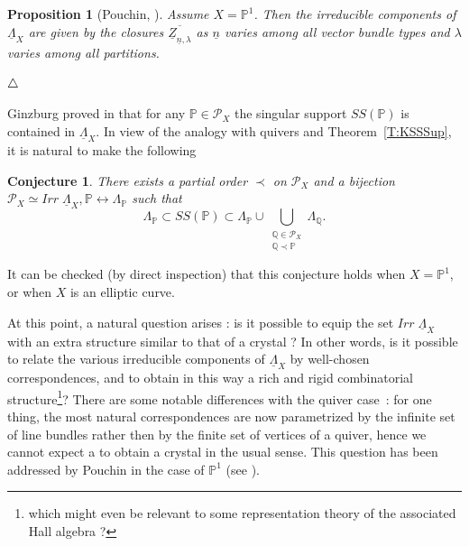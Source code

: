 \documentclass[a4paper,10pt]{amsart}
\def\endexample{$\hfill \triangle$}
\def\endexample{$\hfill \triangle$}
\newtheorem{prop}[theo]{Proposition}
\newtheorem{conj}[theo]{Conjecture}
\numberwithin{equation}{section}
\begin{document}
\begin{prop}[Pouchin, \cite{Pouchin}] Assume $X=\mathbb{P}^1$. Then the irreducible components of $\underline{\Lambda}_X$ are given by
the closures $\overline{\underline{Z}_{\underline{n},\lambda}}$ 
as $\underline{n}$ varies among all vector bundle types and $\lambda$ varies among all partitions.
\end{prop}
\endexample

\vspace{.2in}

Ginzburg proved in \cite{Ginzburg} that for any $\mathbb{P} \in \mathcal{P}_X$ the singular support
$SS(\mathbb{P})$ is contained in $\underline{\Lambda}_X$. In view of the analogy with quivers and Theorem~\ref{T:KSSSup}, it is natural to make the following

\begin{conj} There exists a partial order $\prec$ on $\mathcal{P}_X$ and a bijection $\mathcal{P}_X \simeq Irr\;\underline{\Lambda}_X, \mathbb{P} \leftrightarrow \Lambda_{\mathbb{P}}$ such that
$$\Lambda_{\mathbb{P}} \subset SS(\mathbb{P}) \subset \Lambda_{\mathbb{P}} \cup \bigcup_{\substack{\mathbb{Q} \in \mathcal{P}_X\\ \mathbb{Q} \prec \mathbb{P}}} \Lambda_{\mathbb{Q}}.$$
\end{conj}

It can be checked (by direct inspection) that this conjecture holds when $X=\mathbb{P}^1$, or when $X$ is an elliptic curve.

\vspace{.1in}

At this point, a natural question arises : is it possible to equip the set $Irr\;\underline{\Lambda}_X$ with an extra structure similar to that of a crystal ? In other words, is it possible to relate the various irreducible components of $\underline{\Lambda}_X$ by well-chosen correspondences, and to obtain in this way a rich and rigid combinatorial structure\footnote{which might even be relevant to some representation theory of the associated Hall algebra ?}? There are some notable differences with the quiver case~: for one thing, the most natural correspondences are now parametrized by the infinite set of line bundles rather then by the finite set of vertices of a quiver, hence we cannot expect a to obtain a crystal in the usual sense. This question has been addressed by Pouchin in the case of $\mathbb{P}^1$ (see \cite{Pouchin}).

\vspace{.3in}
\end{document}
